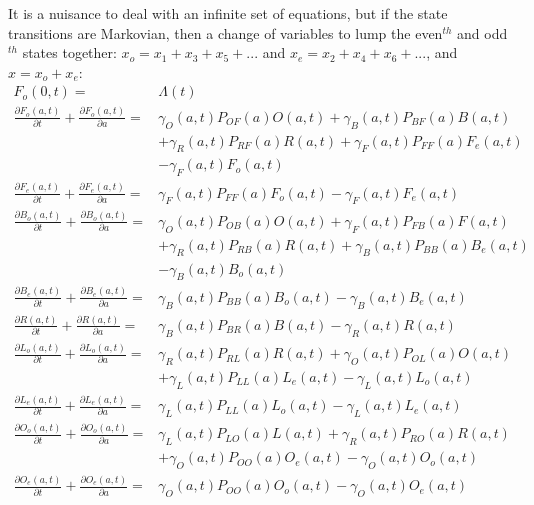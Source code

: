 \documentclass{article}
\begin{document}
It is a nuisance to deal with an infinite set of equations, but if the state transitions are Markovian, then a change of variables to lump the even$^{th}$ and odd$^{th}$ states together: $x_o = x_1 + x_3 + x_5 + ...$ and $x_e = x_2 + x_4 + x_6 + ...$, and $x = x_o + x_e$:  
%
\begin{equation}\begin{array}{rl}
F_o(0,t) =& \Lambda(t) \\ 
%
\frac{\partial F_o(a,t)}{\partial t} + \frac{\partial F_o(a,t)}{\partial a} =& 
\gamma_O(a,t) P_{OF}(a) O(a,t) 
+ \gamma_B(a,t) P_{BF}(a) B(a,t) \\&
 + \gamma_R(a,t) P_{RF}(a) R(a,t)
+ \gamma_F(a,t) P_{FF}(a) F_e(a,t) \\ &
- \gamma_F(a,t) F_o(a,t) \\ 
%
\frac{\partial F_e(a,t)}{\partial t} + \frac{\partial F_e(a,t)}{\partial a} =&  \gamma_F(a,t) P_{FF}(a) F_o (a,t) - \gamma_F(a,t) F_e(a,t) \\ 
%
%
\frac{\partial B_o(a,t)}{\partial t} + \frac{\partial B_o(a,t)}{\partial a} =&  \gamma_O(a,t) P_{OB}(a) O(a,t) + \gamma_F(a,t) P_{FB}(a) F(a,t) \\ & 
+ \gamma_R(a,t) P_{RB}(a) R(a,t) 
+ \gamma_B(a,t) P_{BB}(a) B_e(a,t)\\ & 
- \gamma_B(a,t) B_o(a,t) \\ 
%
\frac{\partial B_e(a,t)}{\partial t} + \frac{\partial B_e(a,t)}{\partial a} =& \gamma_B(a,t) P_{BB}(a) B_o(a,t) -
\gamma_B(a,t) B_e(a,t) 
\\
%
\frac{\partial R(a,t)}{\partial t} + \frac{\partial R(a,t)}{\partial a} =&  \gamma_B(a,t) P_{BR}(a) B(a,t) - \gamma_R(a,t) R(a,t)\\ 
%
\frac{\partial L_o(a,t)}{\partial t} + \frac{\partial L_o(a,t)}{\partial a} =& \gamma_R(a,t) P_{RL}(a) R(a,t) + 
\gamma_O(a,t) P_{OL}(a) O(a,t) \\&
+ \gamma_L(a,t)  P_{LL}(a) L_e(a,t)
- \gamma_L(a,t) L_o(a,t)
\\ 
%
\frac{\partial L_e(a,t)}{\partial t} + \frac{\partial L_e(a,t)}{\partial a} =& \gamma_L(a,t) P_{LL}(a) L_o (a,t) - \gamma_L(a,t) L_e(a,t)
\\ 
%
\frac{\partial O_o(a,t)}{\partial t} + \frac{\partial O_o(a,t)}{\partial a} =& \gamma_L(a,t) P_{LO}(a) L(a,t) 
+ \gamma_R(a,t) P_{RO}(a) R(a,t)  
\\& 
+ \gamma_O(a,t) P_{OO}(a) O_e(a,t)
- \gamma_O(a,t) O_o(a,t)
\\ 
%
\frac{\partial O_e(a,t)}{\partial t} + \frac{\partial O_e(a,t)}{\partial a} =& \gamma_O(a,t) P_{OO}(a) O_o (a,t) - \gamma_O(a,t) O_e(a,t)
\\ 
%
\end{array}\end{equation}
\end{document}
